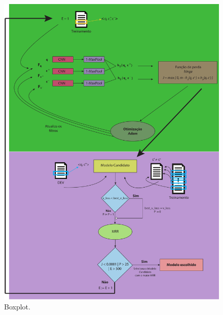\begin{figure}[h]
\centering
\includegraphics[height=1.5\textwidth]{figuras/cap-experimento/evaluation_process.pdf}
\caption{Boxplot.} 
\label{fig:evaluation-process}
\end{figure}

